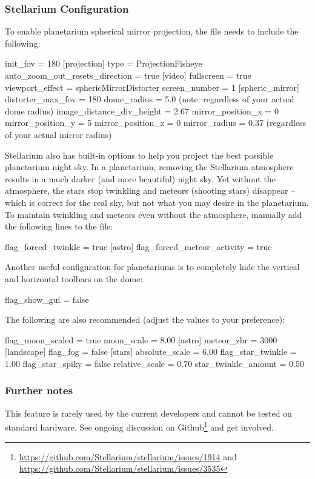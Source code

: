 \subsubsection{Stellarium Configuration}
To enable planetarium spherical mirror projection, the  file needs to include the following:

\begin{configfile}
[navigation]
init_fov = 180
[projection]
type = ProjectionFisheye
auto_zoom_out_resets_direction = true
[video]
fullscreen = true
viewport_effect = sphericMirrorDistorter
screen_number = 1
[spheric_mirror]
distorter_max_fov = 180
dome_radius = 5.0 (note: regardless of your actual dome radius)
image_distance_div_height = 2.67
mirror_position_x = 0
mirror_position_y = 5
mirror_position_z = 0
mirror_radius = 0.37 (regardless of your actual mirror radius)
\end{configfile}

Stellarium also has built-in options to help you project the best possible planetarium night sky.
In a planetarium, removing the Stellarium atmosphere results in a much darker (and more beautiful) night sky.
Yet without the atmosphere, the stars stop twinkling and meteors (shooting stars) disappear -- which is correct
for the real sky, but not what you may desire in the planetarium. To maintain twinkling and meteors even without
the atmosphere, manually add the following lines to the  file:

\begin{configfile}
[stars]
flag_forced_twinkle = true
[astro]
flag_forced_meteor_activity = true
\end{configfile}

Another useful configuration for planetariums is to completely hide the vertical and horizontal toolbars on the
dome:
\begin{configfile}
[gui]
flag_show_gui = false
\end{configfile}

The following are also recommended (adjust the values to your preference):
\begin{configfile}
[viewing]
flag_moon_scaled = true
moon_scale = 8.00
[astro]
meteor_zhr = 3000
[landscape]
flag_fog = false
[stars]
absolute_scale = 6.00
flag_star_twinkle = 1.00
flag_star_spiky = false
relative_scale = 0.70
star_twinkle_amount = 0.50
\end{configfile}


\subsubsection{Further notes}
This feature is rarely used by the current developers and cannot be tested on standard hardware. 
See ongoing discussion on Github\footnote{\url{https://github.com/Stellarium/stellarium/issues/1914} and \\
\url{https://github.com/Stellarium/stellarium/issues/3535}} and get involved.




